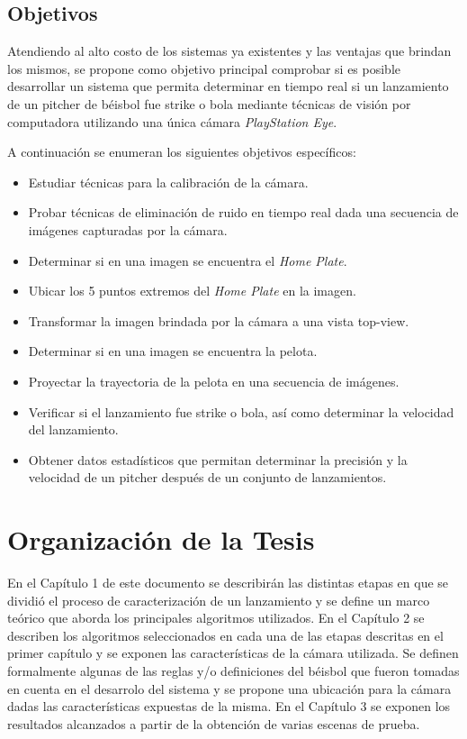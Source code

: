 \subsection*{Objetivos}

Atendiendo al alto costo de los sistemas ya existentes y las ventajas que brindan los mismos, se propone como objetivo principal comprobar si es posible desarrollar un sistema que permita determinar en tiempo real si un lanzamiento de un pitcher de béisbol fue strike o bola mediante técnicas de visión por computadora utilizando una única cámara \textit{PlayStation Eye}.

A continuación se enumeran los siguientes objetivos específicos:
\begin{itemize}
    \item {Estudiar técnicas para la calibración de la cámara.}
    \item {Probar técnicas de eliminación de ruido en tiempo real dada una secuencia de imágenes capturadas por la cámara.}
    \item {Determinar si en una imagen se encuentra el \textit{Home Plate}.}
    \item {Ubicar los 5 puntos extremos del \textit{Home Plate} en la imagen.}
    \item {Transformar la imagen brindada por la cámara a una vista top-view.}
    \item {Determinar si en una imagen se encuentra la pelota.}
    \item {Proyectar la trayectoria de la pelota en una secuencia de imágenes.}
    \item {Verificar si el lanzamiento fue strike o bola, así como determinar la velocidad del lanzamiento.}
    \item {Obtener datos estadísticos que permitan determinar la precisión y la velocidad de un pitcher después de un conjunto de lanzamientos.}
\end{itemize}


\section*{Organización de la Tesis}

En el Capítulo 1 de este documento se describirán las distintas etapas en que se dividió el proceso de caracterización de un lanzamiento y se define un marco teórico que aborda los principales algoritmos utilizados. En el Capítulo 2 se describen los algoritmos seleccionados en cada una de las etapas descritas en el primer capítulo y se exponen las características de la cámara utilizada. Se definen formalmente algunas de las reglas y/o definiciones del béisbol que fueron tomadas en cuenta en el desarrolo del sistema y se propone una ubicación para la cámara dadas las características expuestas de la misma. En el Capítulo 3 se exponen los resultados alcanzados a partir de la obtención de varias escenas de prueba.

